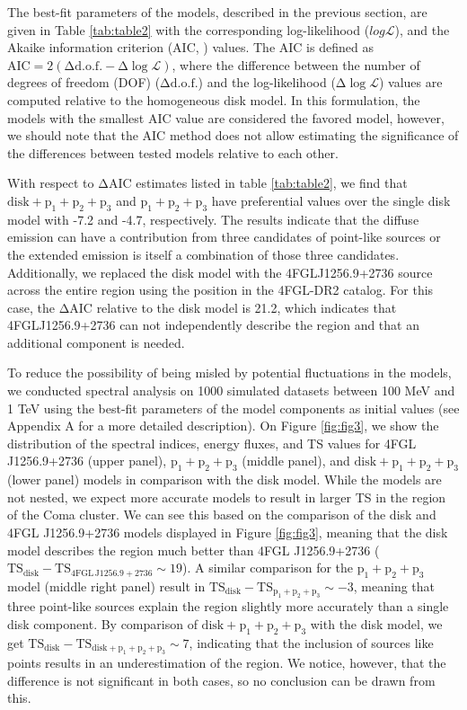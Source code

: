 \documentclass[fleqn,usenatbib]{mnras}
\begin{document}
The best-fit parameters of the models, described in the previous section, are given in Table \ref{tab:table2} with the corresponding log-likelihood ($log\mathcal{L}$), and the Akaike information criterion (AIC, \citep{ 1974ITAC...19..716A}) values. The AIC is defined as $\mathrm{AIC=2(\Delta d.o.f.-\Delta \log\mathcal{L})}$, where the difference between the number of degrees of freedom (DOF) ($\mathrm{\Delta d.o.f.}$) and the log-likelihood ($\mathrm{\Delta \log\mathcal{L}}$) values are computed relative to the homogeneous disk model. In this formulation, the models with the smallest AIC value are considered the favored model, however, we should note that the AIC method does not allow estimating the significance of the differences between tested models relative to each other.

With respect to $\mathrm{\Delta AIC}$ estimates listed in table \ref{tab:table2}, we find that $\mathrm{disk+p_1+p_2+p_3}$ and $\mathrm{p_1+p_2+p_3}$ have preferential values over the single disk model with -7.2 and -4.7, respectively. The results indicate that the diffuse emission can have a contribution from three candidates of point-like sources or the extended emission is itself a combination of those three candidates. Additionally, we replaced the disk model with the 4FGLJ1256.9+2736 source across the entire region using the position in the 4FGL-DR2 catalog. For this case, the $\mathrm{\Delta AIC}$ relative to the disk model is 21.2, which indicates that 4FGLJ1256.9+2736 can not independently describe the region and that an additional component is needed.

To reduce the possibility of being misled by potential fluctuations in the models, we conducted spectral analysis on 1000 simulated datasets between 100 MeV and 1 TeV using the best-fit parameters of the model components as initial values (see Appendix A for a more detailed description). On Figure \ref{fig:fig3}, we show the distribution of the spectral indices, energy fluxes, and TS values for 4FGL J1256.9+2736 (upper panel), $\mathrm{p_1+p_2+p_3}$ (middle panel), and $\mathrm{disk+p_1+p_2+p_3}$ (lower panel) models in comparison with the disk model. While the models are not nested, we expect more accurate models to result in larger TS in the region of the Coma cluster. We can see this based on the comparison of the disk and 4FGL J1256.9+2736 models displayed in Figure \ref{fig:fig3}, meaning that the disk model describes the region much better than 4FGL J1256.9+2736 ($\mathrm{TS_{disk}-TS_{4FGL\,J1256.9+2736}\sim19}$).  
A similar comparison for the $\mathrm{p_1+p_2+p_3}$ model (middle right panel) result in $\mathrm{TS_{disk}-TS_{p_1+p_2+p_3}\sim-3}$, meaning that three point-like sources explain the region slightly more accurately than a single disk component. By comparison of $\mathrm{disk+p_1+p_2+p_3}$ with the disk model, we get $\mathrm{TS_{disk}-TS_{disk+p_1+p_2+p_3}\sim7}$, indicating that the inclusion of sources like points results in an underestimation of the region. We notice, however, that the difference is not significant in both cases, so no conclusion can be drawn from this.
\end{document}
